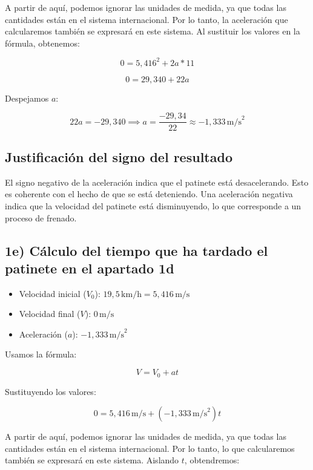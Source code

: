 \documentclass{article}
\begin{document}
\justify
A partir de aquí, podemos ignorar las unidades de medida, ya que todas las cantidades están en el sistema internacional. Por lo tanto, la aceleración que calcularemos también se expresará en este sistema. Al sustituir los valores en la fórmula, obtenemos:

\[
0 = 5,416^2 + 2a*11
\]

\[
0 = 29,340 + 22a
\]

Despejamos \(a\):

\[
22a = -29,340 \implies a = \frac{-29,34}{22} \approx \boxed{-1,333 \, \text{m/s}^2}
\]

\subsection*{Justificación del signo del resultado}

El signo negativo de la aceleración indica que el patinete está desacelerando. Esto es coherente con el hecho de que se está deteniendo. Una aceleración negativa indica que la velocidad del patinete está disminuyendo, lo que corresponde a un proceso de frenado.


\subsection*{1e) Cálculo del tiempo que ha tardado el patinete en el apartado 1d}


\begin{itemize}
    \item Velocidad inicial (\( V_0 \)): \( 19,5 \, \text{km/h} = 5,416 \, \text{m/s} \)
    \item Velocidad final (\( V \)): \( 0 \, \text{m/s} \)
    \item Aceleración (\( a \)): \( -1,333 \, \text{m/s}^2 \)
\end{itemize}

Usamos la fórmula:

\[
V = V_0 + at
\]

Sustituyendo los valores:

\[
0 = 5,416 \, \text{m/s} + (-1,333 \, \text{m/s}^2) t 
\]

\justify
A partir de aquí, podemos ignorar las unidades de medida, ya que todas las cantidades están en el sistema internacional. Por lo tanto, lo que calcularemos también se expresará en este sistema. Aislando \( t\), obtendremos:
\end{document}
